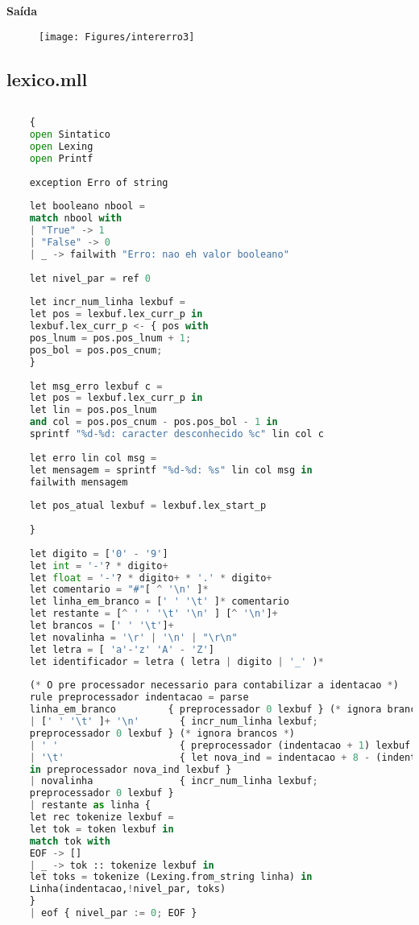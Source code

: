 \documentclass[hidelinks,12pt]{article}
\begin{document}
\textbf{{\large Saída}}

\begin{figure}[!h]
	\centering
	\texttt{[image: Figures/intererro3]}
\end{figure}
	
	
	
\renewcommand{\appendixtocname}{Ap\^endice}
\renewcommand{\appendixpagename}{Ap\^endice}
\begin{appendices}
	
	\chapter{lexico.mll}
		
	\begin{lstlisting}[caption=lexico.mll, language=python]
	
	{
	open Sintatico
	open Lexing
	open Printf
	
	exception Erro of string
	
	let booleano nbool = 
	match nbool with
	| "True" -> 1
	| "False" -> 0
	| _ -> failwith "Erro: nao eh valor booleano"  
	
	let nivel_par = ref 0
	
	let incr_num_linha lexbuf =
	let pos = lexbuf.lex_curr_p in
	lexbuf.lex_curr_p <- { pos with
	pos_lnum = pos.pos_lnum + 1;
	pos_bol = pos.pos_cnum;
	}
	
	let msg_erro lexbuf c =
	let pos = lexbuf.lex_curr_p in
	let lin = pos.pos_lnum
	and col = pos.pos_cnum - pos.pos_bol - 1 in
	sprintf "%d-%d: caracter desconhecido %c" lin col c
	
	let erro lin col msg =
	let mensagem = sprintf "%d-%d: %s" lin col msg in
	failwith mensagem
	
	let pos_atual lexbuf = lexbuf.lex_start_p
	
	}
	
	let digito = ['0' - '9']
	let int = '-'? * digito+
	let float = '-'? * digito+ * '.' * digito+
	let comentario = "#"[ ^ '\n' ]*
	let linha_em_branco = [' ' '\t' ]* comentario
	let restante = [^ ' ' '\t' '\n' ] [^ '\n']+
	let brancos = [' ' '\t']+
	let novalinha = '\r' | '\n' | "\r\n"
	let letra = [ 'a'-'z' 'A' - 'Z']
	let identificador = letra ( letra | digito | '_' )*
	
	(* O pre processador necessario para contabilizar a identacao *)
	rule preprocessador indentacao = parse
	linha_em_branco         { preprocessador 0 lexbuf } (* ignora brancos *)
	| [' ' '\t' ]+ '\n'       { incr_num_linha lexbuf;
	preprocessador 0 lexbuf } (* ignora brancos *)
	| ' '                     { preprocessador (indentacao + 1) lexbuf }
	| '\t'                    { let nova_ind = indentacao + 8 - (indentacao mod 8) 
	in preprocessador nova_ind lexbuf }
	| novalinha               { incr_num_linha lexbuf;
	preprocessador 0 lexbuf }
	| restante as linha {
	let rec tokenize lexbuf =
	let tok = token lexbuf in
	match tok with
	EOF -> []
	| _ -> tok :: tokenize lexbuf in
	let toks = tokenize (Lexing.from_string linha) in
	Linha(indentacao,!nivel_par, toks)
	}
	| eof { nivel_par := 0; EOF }
	

\end{lstlisting}
\end{appendices}
\end{document}
